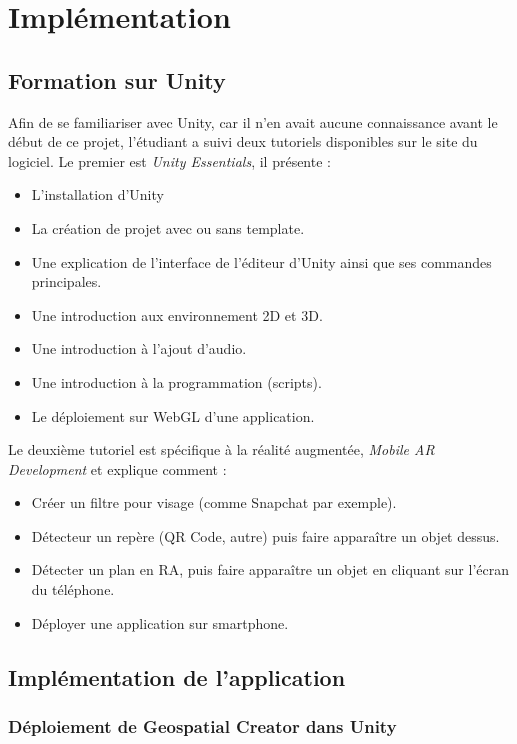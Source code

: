 \chapter{Implémentation}
\section{Formation sur Unity}
Afin de se familiariser avec Unity, car il n'en avait aucune connaissance avant le début de ce projet, l'étudiant a suivi deux tutoriels disponibles
sur le site du logiciel\cite{UnityEssentialsPathway}\Cite{MobileARDevelopment}. Le premier est \textit{Unity Essentials}, il présente :

\begin{itemize}[label={\textbullet}]
    \item L'installation d'Unity
    \item La création de projet avec ou sans template.
    \item Une explication de l'interface de l'éditeur d'Unity ainsi que ses commandes principales.
    \item Une introduction aux environnement 2D et 3D.
    \item Une introduction à l'ajout d'audio.
    \item Une introduction à la programmation (scripts).
    \item Le déploiement sur WebGL d'une application.
\end{itemize}


Le deuxième tutoriel est spécifique à la réalité augmentée, \textit{Mobile AR Development} et explique comment :

\begin{itemize}[label={\textbullet}]
    \item Créer un filtre pour visage (comme Snapchat par exemple).
    \item Détecteur un repère (QR Code, autre) puis faire apparaître un objet dessus.
    \item Détecter un plan en RA, puis faire apparaître un objet en cliquant sur l'écran du téléphone.
    \item Déployer une application sur smartphone.
\end{itemize}

\section{Implémentation de l'application}
\subsection{Déploiement de Geospatial Creator dans Unity}

